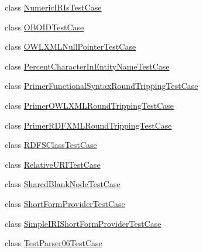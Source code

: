 \begin{DoxyCompactItemize}
\item 
class \hyperlink{classorg_1_1semanticweb_1_1owlapi_1_1api_1_1test_1_1syntax_1_1_numeric_i_r_is_test_case}{Numeric\-I\-R\-Is\-Test\-Case}
\item 
class \hyperlink{classorg_1_1semanticweb_1_1owlapi_1_1api_1_1test_1_1syntax_1_1_o_b_o_i_d_test_case}{O\-B\-O\-I\-D\-Test\-Case}
\item 
class \hyperlink{classorg_1_1semanticweb_1_1owlapi_1_1api_1_1test_1_1syntax_1_1_o_w_l_x_m_l_null_pointer_test_case}{O\-W\-L\-X\-M\-L\-Null\-Pointer\-Test\-Case}
\item 
class \hyperlink{classorg_1_1semanticweb_1_1owlapi_1_1api_1_1test_1_1syntax_1_1_percent_character_in_entity_name_test_case}{Percent\-Character\-In\-Entity\-Name\-Test\-Case}
\item 
class \hyperlink{classorg_1_1semanticweb_1_1owlapi_1_1api_1_1test_1_1syntax_1_1_primer_functional_syntax_round_tripping_test_case}{Primer\-Functional\-Syntax\-Round\-Tripping\-Test\-Case}
\item 
class \hyperlink{classorg_1_1semanticweb_1_1owlapi_1_1api_1_1test_1_1syntax_1_1_primer_o_w_l_x_m_l_round_tripping_test_case}{Primer\-O\-W\-L\-X\-M\-L\-Round\-Tripping\-Test\-Case}
\item 
class \hyperlink{classorg_1_1semanticweb_1_1owlapi_1_1api_1_1test_1_1syntax_1_1_primer_r_d_f_x_m_l_round_tripping_test_case}{Primer\-R\-D\-F\-X\-M\-L\-Round\-Tripping\-Test\-Case}
\item 
class \hyperlink{classorg_1_1semanticweb_1_1owlapi_1_1api_1_1test_1_1syntax_1_1_r_d_f_s_class_test_case}{R\-D\-F\-S\-Class\-Test\-Case}
\item 
class \hyperlink{classorg_1_1semanticweb_1_1owlapi_1_1api_1_1test_1_1syntax_1_1_relative_u_r_i_test_case}{Relative\-U\-R\-I\-Test\-Case}
\item 
class \hyperlink{classorg_1_1semanticweb_1_1owlapi_1_1api_1_1test_1_1syntax_1_1_shared_blank_node_test_case}{Shared\-Blank\-Node\-Test\-Case}
\item 
class \hyperlink{classorg_1_1semanticweb_1_1owlapi_1_1api_1_1test_1_1syntax_1_1_short_form_provider_test_case}{Short\-Form\-Provider\-Test\-Case}
\item 
class \hyperlink{classorg_1_1semanticweb_1_1owlapi_1_1api_1_1test_1_1syntax_1_1_simple_i_r_i_short_form_provider_test_case}{Simple\-I\-R\-I\-Short\-Form\-Provider\-Test\-Case}
\item 
class \hyperlink{classorg_1_1semanticweb_1_1owlapi_1_1api_1_1test_1_1syntax_1_1_test_parser06_test_case}{Test\-Parser06\-Test\-Case}

\end{DoxyCompactItemize}
